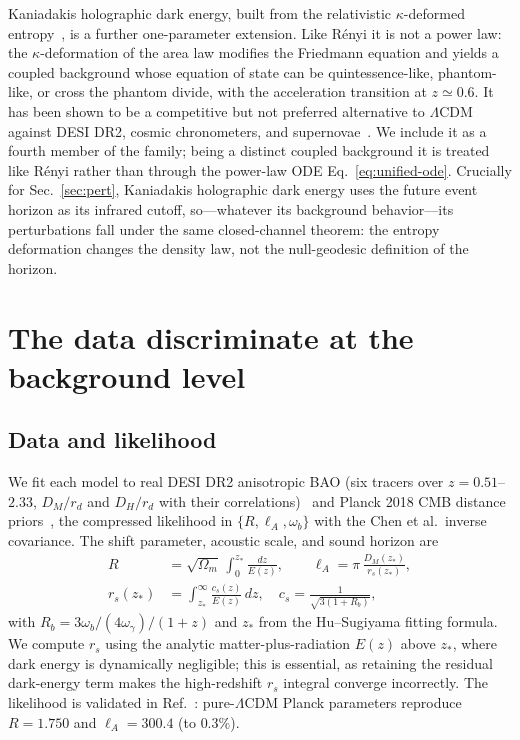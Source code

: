 \documentclass[twocolumn,10pt]{article}
\begin{document}
Kaniadakis holographic dark energy, built from the relativistic
$\kappa$-deformed entropy~\cite{Luciano2025}, is a further one-parameter
extension. Like R\'enyi it is not a power law: the $\kappa$-deformation of the
area law modifies the Friedmann equation and yields a coupled background whose
equation of state can be quintessence-like, phantom-like, or cross the phantom
divide, with the acceleration transition at $z\simeq0.6$. It has been shown to
be a competitive but not preferred alternative to $\Lambda$CDM against DESI
DR2, cosmic chronometers, and supernovae~\cite{Luciano2025,Luciano2026}. We
include it as a fourth member of the family; being a distinct coupled
background it is treated like R\'enyi rather than through the power-law ODE
Eq.~\eqref{eq:unified-ode}. Crucially for Sec.~\ref{sec:pert}, Kaniadakis
holographic dark energy uses the future event horizon as its infrared cutoff,
so---whatever its background behavior---its perturbations fall under the same
closed-channel theorem: the entropy deformation changes the density law, not
the null-geodesic definition of the horizon.

\section{The data discriminate at the background level}
\label{sec:discrim}

\subsection{Data and likelihood}

We fit each model to real DESI DR2 anisotropic BAO
(six tracers over $z=0.51$--$2.33$, $D_M/r_d$ and $D_H/r_d$ with their
correlations)~\cite{DESIDR2} and Planck 2018 CMB distance
priors~\cite{Chen2019,Planck2018}, the compressed likelihood in
$\{R,\ell_A,\omega_b\}$ with the Chen et al.\ inverse covariance. The shift
parameter, acoustic scale, and sound horizon are
\begin{align}
R &= \sqrt{\Omega_{m}}\,\textstyle\int_0^{z_*}\!\frac{dz}{E(z)}, \qquad
\ell_A = \pi\,\frac{D_M(z_*)}{r_s(z_*)},\\
r_s(z_*) &= \textstyle\int_{z_*}^{\infty}\!\frac{c_s(z)}{E(z)}\,dz, \quad
c_s=\frac{1}{\sqrt{3(1+R_b)}},
\end{align}
with $R_b=3\omega_b/(4\omega_\gamma)/(1+z)$ and $z_*$ from the
Hu--Sugiyama fitting formula. We compute $r_s$ using the analytic
matter-plus-radiation $E(z)$ above $z_*$, where dark energy is dynamically
negligible; this is essential, as retaining the residual dark-energy term
makes the high-redshift $r_s$ integral converge incorrectly. The likelihood
is validated in Ref.~\cite{StepPaper}: pure-$\Lambda$CDM Planck parameters
reproduce $R=1.750$ and $\ell_A=300.4$ (to $0.3\%$).
\end{document}
